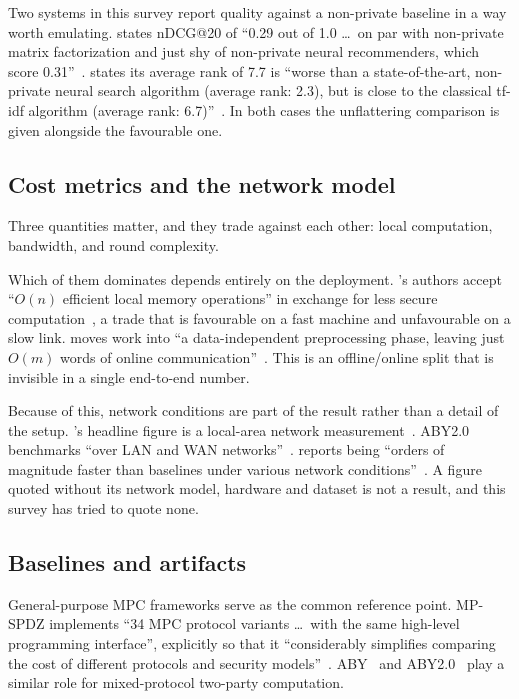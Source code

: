 Two systems in this survey report quality against a non-private baseline in a way worth
emulating. \nudgeplain{} states nDCG@20 of ``0.29 out of 1.0 \dots\ on par with non-private matrix
factorization and just shy of non-private neural recommenders, which score 0.31''~\cite{nudge2026}.
\tiptoeplain{} states its average rank of 7.7 is ``worse than a state-of-the-art, non-private
neural search algorithm (average rank: 2.3), but is close to the classical tf-idf algorithm
(average rank: 6.7)''~\cite{tiptoe2023}. In both cases the unflattering comparison is given
alongside the favourable one.

\subsection{Cost metrics and the network model}
\label{sec:eval:cost}

Three quantities matter, and they trade against each other: local computation, bandwidth, and
round complexity.

Which of them dominates depends entirely on the deployment. \floram{}'s authors accept ``$O(n)$
efficient local memory operations'' in exchange for less secure computation~\cite{floram2017}, a
trade that is favourable on a fast machine and unfavourable on a slow link.
\duoramplain{} moves work into ``a data-independent preprocessing phase, leaving just $O(m)$ words
of online communication''~\cite{duoram2023}. This is an offline/online split that is invisible in a
single end-to-end number.

Because of this, network conditions are part of the result rather than a detail of the setup.
\nudgeplain{}'s headline figure is a local-area network measurement~\cite{nudge2026}.
ABY2.0 benchmarks ``over LAN and WAN networks''~\cite{aby22021}. \compassplain{} reports being
``orders of magnitude faster than baselines under various network conditions''~\cite{compass2025}.
A figure quoted without its network model, hardware and dataset is not a result, and this survey
has tried to quote none.

\subsection{Baselines and artifacts}
\label{sec:eval:baselines}

General-purpose MPC frameworks serve as the common reference point. MP-SPDZ implements ``34 MPC
protocol variants \dots\ with the same high-level programming interface'', explicitly so that it
``considerably simplifies comparing the cost of different protocols and security
models''~\cite{mpspdz2020}. ABY~\cite{aby2015} and ABY2.0~\cite{aby22021} play a similar role for
mixed-protocol two-party computation.

